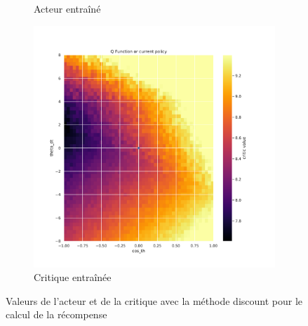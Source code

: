 \begin{figure}[H]
\begin{subfigure}{0.3\textwidth}
        \caption{Acteur entraîné}
    \end{subfigure}
    \begin{subfigure}{0.3\textwidth}
        \includegraphics[width=\textwidth]{figures/iteration4/0_critic_discount_post_Pendulum-v0.pdf}
        \caption{Critique entraînée}
    \end{subfigure}
    \caption{Valeurs de l'acteur et de la critique avec la méthode discount pour le calcul de la récompense}
    \label{fig:itr4_discount}
\end{figure}

